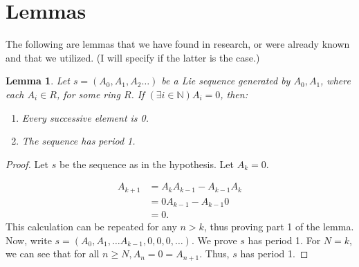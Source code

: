 \documentclass[12pt, letterpaper]{article}
\newtheorem{lemma}[theorem]{Lemma}
\theoremstyle{definition}
\begin{document}
\section{Lemmas}
The following are lemmas that we have found in research, or were already known and that we utilized. (I will specify if the latter is the case.)

\begin{lemma}
Let $s = (A_0,A_1,A_2\dots)$ be a Lie sequence generated by $A_0,A_1$, where each $A_i \in R$, for some ring $R$. If $(\exists i \in \mathbb{N}) A_i = 0$, then:
\begin{enumerate}
\item Every successive element is 0.
\item The sequence has period 1.
\end{enumerate}
\end{lemma}

\begin{proof}
Let $s$ be the sequence as in the hypothesis. Let $A_k=0$.

\begin{align*}
A_{k+1} &= A_kA_{k-1}-A_{k-1}A_k \\
&= 0A_{k-1} - A_{k-1}0 \\
&= 0.
\end{align*}
This calculation can be repeated for any $n>k$, thus proving part 1 of the lemma. Now, write $s = (A_0,A_1,\dots A_{k-1}, 0,0,0,\dots)$. We prove $s$ has period 1. For $N=k$, we can see that for all $n\geq N, A_n=0=A_{n+1}$. Thus, $s$ has period 1.


\end{proof}
\end{document}

